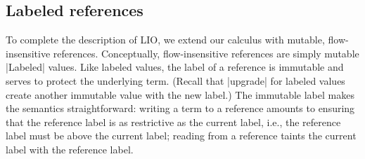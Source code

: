 \subsection{Labeled references}

To complete the description of LIO, we extend our \lio{} calculus  with
mutable, flow-insensitive references.
%
Conceptually, flow-insensitive references are simply mutable |Labeled| values.
%
Like labeled values, the label of a reference is immutable and serves to
protect the underlying term.
%
(Recall that |upgrade| for labeled values create another immutable
value with the new label.)
%
The immutable label makes the semantics straightforward: writing a
term to a reference amounts to ensuring that the reference label is as
restrictive as the current label, i.e., the reference label must be
above the current label; reading from a reference taints the current
label with the reference label.
%

